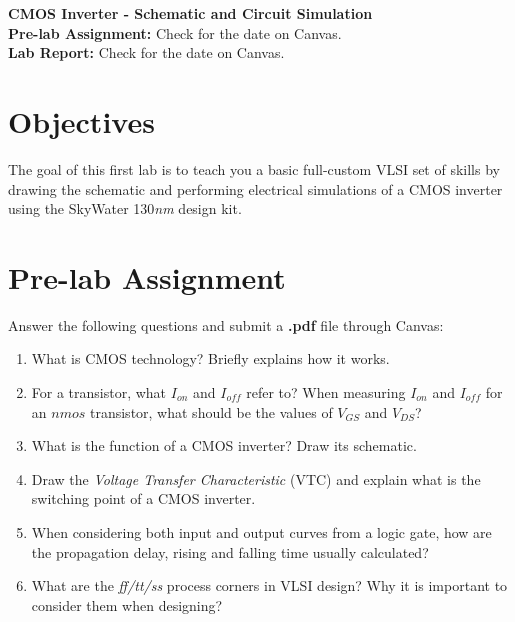 \newcommand{\labtitle}{ECE/CS 5710/6710 - Lab 1}
\newcommand{\labsubtitle}{CMOS Inverter - Schematic and Circuit Simulation}
\vlsiheader
	
\begin{center}
	\LARGE\textbf{\labsubtitle} \\
	\large\textbf{Pre-lab Assignment:} Check for the date on Canvas. \\
\large\textbf{Lab Report:} Check for the date on Canvas.
\end{center}
\section{Objectives}
The goal of this first lab is to teach you a basic full-custom VLSI set of skills by drawing the schematic and performing electrical simulations of a CMOS inverter using the SkyWater 130\emph{nm} design kit.

\section{Pre-lab Assignment}
\begin{prelab}
Answer the following questions and submit a \textbf{.pdf} file through Canvas:
\begin{enumerate}
	\item What is CMOS technology? Briefly explains how it works.
	\item For a transistor, what $I_{on}$ and $I_{off}$ refer to? When measuring $I_{on}$ and $I_{off}$ for an $nmos$ transistor, what should be the values of $V_{GS}$ and $V_{DS}$?
	\item What is the function of a CMOS inverter? Draw its schematic.
	\item Draw the \textit{Voltage Transfer Characteristic} (VTC) and explain what is the switching point of a CMOS inverter.
	\item When considering both input and output curves from a logic gate, how are the propagation delay, rising and falling time usually calculated?
	\item What are the \textit{ff/tt/ss} process corners in VLSI design? Why it is important to consider them when designing?
\end{enumerate}
	\vspace{-5mm}
\end{prelab}


